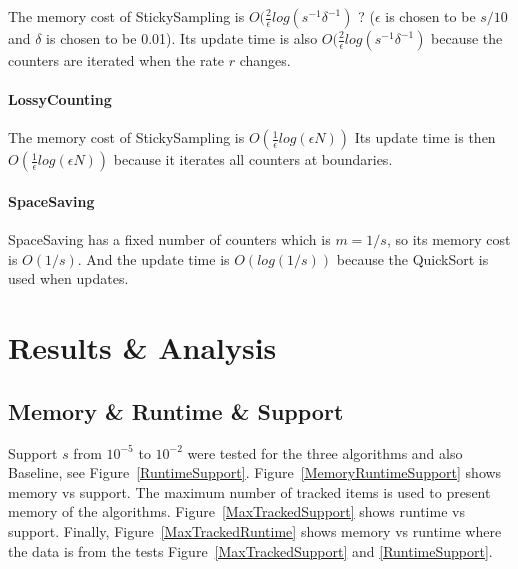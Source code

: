 \documentclass[10pt]{article}
\begin{document}
The memory cost of StickySampling is $O(\frac{2}{\epsilon}log(s^{-1}\delta^{-1})$ ? 
($\epsilon{}$ is chosen to be $s/10$ and $\delta{}$ is chosen to be 0.01).
Its update time is also $O(\frac{2}{\epsilon}log(s^{-1}\delta^{-1})$ because the counters are iterated when the rate $r$ changes.
\paragraph{LossyCounting}
The memory cost of StickySampling is $O(\frac{1}{\epsilon}log(\epsilon{}N))$ 
Its update time is then $O(\frac{1}{\epsilon}log(\epsilon{}N))$ because it iterates all counters at boundaries.
\paragraph{SpaceSaving}
SpaceSaving has a fixed number of counters which is $m = 1/s$, so its memory cost is $O(1/s)$. 
And the update time is $O(log(1/s))$ because the QuickSort is used when updates.

\section{Results \& Analysis}

\subsection{Memory \& Runtime \& Support}
Support $s$ from $10^{-5}$ to $10^{-2}$ were tested for the three algorithms and also Baseline,
see Figure~\ref{RuntimeSupport}.
Figure~\ref{MemoryRuntimeSupport} shows memory vs support. 
The maximum number of tracked items is used to present memory of the algorithms.
Figure~\ref{MaxTrackedSupport} shows runtime vs support.
Finally, Figure~\ref{MaxTrackedRuntime} shows memory vs runtime 
where the data is from the tests Figure~\ref{MaxTrackedSupport} and \ref{RuntimeSupport}.
\end{document}
